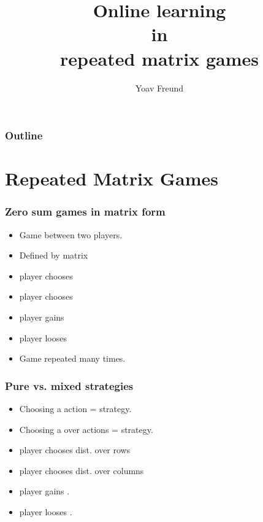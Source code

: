 \documentclass[handout]{beamer}
\title [Learning in repeated games] %
{Online learning \\ in \\ repeated matrix games}
\author[Freund] %
{Yoav Freund}
\institute[Universities of Somewhere and Elsewhere] %
\begin{document}
%

\begin{frame}
  \titlepage
\end{frame}

\begin{frame}
  \frametitle{Outline}
  \tableofcontents[pausesections]
\end{frame}

\section{Repeated Matrix Games}

\begin{frame}
\frametitle{Zero sum games in matrix form}
\begin{itemize}
\item Game between two players.
\item Defined by  matrix \R{$\M$}
\item {} player chooses 
\item {} player chooses 
\item {} player gains 
\item {} player looses 
\item Game repeated many times.
\end{itemize}
\end{frame}

\begin{frame}
\frametitle{Pure vs. mixed strategies}
\begin{itemize}
\item Choosing a  action =  strategy.
\item Choosing a  over actions =  strategy.
\item {} player chooses dist. over rows \R{$\P$}
\item {} player chooses dist. over columns \R{$\Q$}
\item {} player gains \R{$\M(\P,\Q)$}.
\item {} player looses \R{$\M(\P,\Q)$}.
\end{itemize}
\end{frame}
\end{document}
